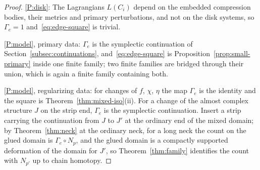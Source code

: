 \documentclass[11pt]{amsart}
\theoremstyle{definition}
\theoremstyle{remark}
\theoremstyle{plain}
\numberwithin{equation}{section}
\begin{document}
\begin{proof}
\ref{P:disk}: The Lagrangians $L(C_i)$ depend on the embedded compression
bodies, their metrics and primary perturbations, and not on the disk
systems, so $\Gamma_e=1$ and~\eqref{eq:edge-square} is trivial.

\ref{P:model}, primary data: $\Gamma_e$ is the symplectic continuation of
Section~\ref{subsec:continuations}, and~\eqref{eq:edge-square} is
Proposition~\ref{prop:small-primary} inside one finite family; two
finite families are bridged through their union, which is again a finite
family containing both.

\ref{P:model}, regularizing data: for changes of $f$, $\chi$, $\eta$ the map
$\Gamma_e$ is the identity and the square is Theorem~\ref{thm:mixed-iso}(ii). For a
change of the almost complex structure $J$ on the strip end, $\Gamma_e$ is the
symplectic continuation. Insert a strip carrying the continuation from $J$ to
$J'$ at the ordinary end of the mixed domain; by Theorem~\ref{thm:neck} at the
ordinary neck, for a long neck the count on the glued domain is $\Gamma_e\circ N_p$,
and the glued domain is a compactly supported deformation of the domain for
$J'$, so Theorem~\ref{thm:family} identifies the count with $N_{p'}$ up to
chain homotopy.


\end{proof}
\end{document}
